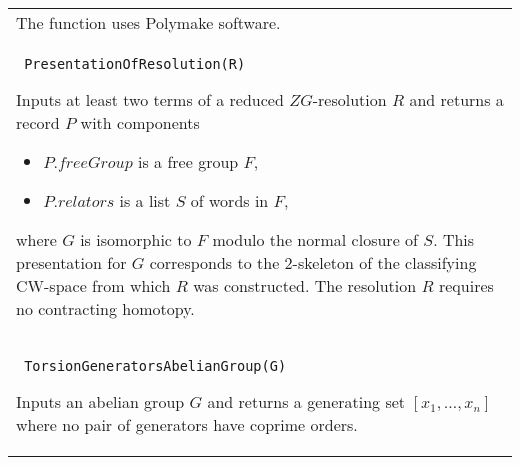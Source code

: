\documentclass[a4paper,11pt]{report}
\begin{document}
{\begin{center}
\begin{tabular}{|l|}
 The function uses Polymake software. \\
 \index{PresentationOfResolution} \texttt{ PresentationOfResolution(R) } 

 Inputs at least two terms of a reduced $ZG$-resolution $R$ and returns a record $P$ with components 
\begin{itemize}
\item  $P.freeGroup$ is a free group $F$, 
\item  $P.relators$ is a list $S$ of words in $F$, 
\end{itemize}
 where $G$ is isomorphic to $F$ modulo the normal closure of $S$. This presentation for $G$ corresponds to the 2-skeleton of the classifying CW-space from which $R$ was constructed. The resolution $R$ requires no contracting homotopy. \\
 \index{TorsionGeneratorsAbelianGroup} \texttt{ TorsionGeneratorsAbelianGroup(G) } 

 Inputs an abelian group $G$ and returns a generating set $[x_1, \ldots ,x_n]$ where no pair of generators have coprime orders. \\
\end{tabular}\\[2mm]
\end{center}

 }

 
\end{document}
